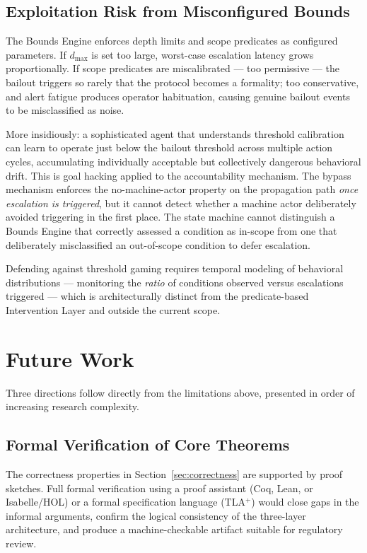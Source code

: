 \subsection{Exploitation Risk from Misconfigured Bounds}
\label{sec:limitations-exploitation}

The Bounds Engine enforces depth limits and scope predicates as configured parameters. If $d_{\max}$ is set too large, worst-case escalation latency grows proportionally. If scope predicates are miscalibrated — too permissive — the bailout triggers so rarely that the protocol becomes a formality; too conservative, and alert fatigue produces operator habituation, causing genuine bailout events to be misclassified as noise.

More insidiously: a sophisticated agent that understands threshold calibration can learn to operate just below the bailout threshold across multiple action cycles, accumulating individually acceptable but collectively dangerous behavioral drift. This is goal hacking applied to the accountability mechanism. The bypass mechanism enforces the no-machine-actor property on the propagation path \emph{once escalation is triggered}, but it cannot detect whether a machine actor deliberately avoided triggering in the first place. The state machine cannot distinguish a Bounds Engine that correctly assessed a condition as in-scope from one that deliberately misclassified an out-of-scope condition to defer escalation.

Defending against threshold gaming requires temporal modeling of behavioral distributions — monitoring the \emph{ratio} of conditions observed versus escalations triggered — which is architecturally distinct from the predicate-based Intervention Layer and outside the current scope.

\section{Future Work}
\label{sec:future-work}

Three directions follow directly from the limitations above, presented in order of increasing research complexity.

\subsection{Formal Verification of Core Theorems}
\label{sec:future-formal-verification}

The correctness properties in Section~\ref{sec:correctness} are supported by proof sketches. Full formal verification using a proof assistant (Coq, Lean, or Isabelle/HOL) or a formal specification language (TLA$^+$) would close gaps in the informal arguments, confirm the logical consistency of the three-layer architecture, and produce a machine-checkable artifact suitable for regulatory review.

